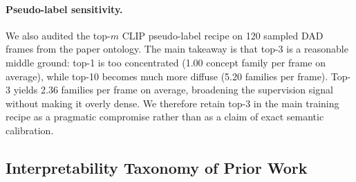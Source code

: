\begin{table}[t]
\caption{Main-paper protocol map. This table gives a concise reading key for the main result blocks: recipe family, checkpoint rule, seed count, and which score source defines the reported alert timing.}
\label{tab:protocol_map_main}
\centering\small
{}
\end{table}

\paragraph{Pseudo-label sensitivity.}
We also audited the top-$m$ CLIP pseudo-label recipe on 120 sampled DAD frames
from the paper ontology. The main takeaway is that top-3 is a reasonable
middle ground: top-1 is too concentrated (1.00 concept family per frame on
average), while top-10 becomes much more diffuse (5.20 families per frame).
Top-3 yields 2.36 families per frame on average, broadening the supervision
signal without making it overly dense. We therefore retain top-3 in the main
training recipe as a pragmatic compromise rather than as a claim of exact
semantic calibration.

\subsection{Interpretability Taxonomy of Prior Work}

